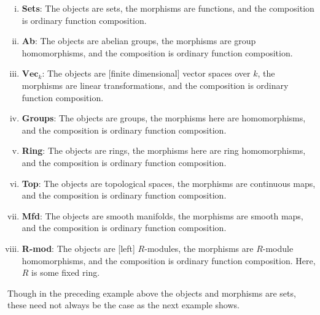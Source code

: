 \begin{ex} \hfill
	\begin{enumerate}[(i)]
	\item \textbf{Sets}: The objects are sets, the morphisms are functions, and the composition is ordinary function composition.
	\item \textbf{Ab}: The objects are abelian groups, the morphisms are group homomorphisms, and the composition is ordinary function composition.
	\item $\textbf{Vec}_{k}$: The objects are [finite dimensional] vector spaces over $k$, the morphisms are linear transformations, and the composition is ordinary function composition.
	\item \textbf{Groups}: The objects are groups, the morphisms here are homomorphisms, and the composition is ordinary function composition. 
	\item \textbf{Ring}: The objects are rings, the morphisms here are ring homomorphisms, and the composition is ordinary function composition. 
	\item \textbf{Top}: The objects are topological spaces, the morphisms are continuous maps, and the composition is ordinary function composition. 
	\item \textbf{Mfd}: The objects are smooth manifolds, the morphisms are smooth maps, and the composition is ordinary function composition. 
	\item \textbf{R-mod}: The objects are [left] $R$-modules, the morphisms are $R$-module homomorphisms, and the composition is ordinary function composition. Here, $R$ is some fixed ring. 
	\end{enumerate} \xqed
\end{ex}


Though in the preceding example above the objects and morphisms are sets, these need not always be the case as the next example shows. 


